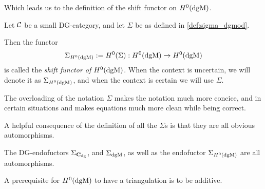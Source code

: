 Which leads us to the definition of the shift functor on \( H^0(\operatorname{dgM}) \).

\begin{definition}
    \label{def:sigma_h_0_dgmod}
    Let \( {\mathcal{C}} \) be a small DG-category, and let \( \Sigma \) be as defined in \autoref{def:sigma_dgmod}.

    Then the functor
    \[
        \Sigma_{H^0(\operatorname{dgM})} := H^0(\Sigma): H^0(\operatorname{dgM}) \to H^0(\operatorname{dgM})
    \]
    is called the \emph{shift functor of \( H^0(\operatorname{dgM}) \)}. When the context is uncertain, we will denote it as \( \Sigma_{H^0(\operatorname{dgM})} \), and when the context is certain we will use \( \Sigma \).
\end{definition}

The overloading of the notation \( \Sigma \) makes the notation much more concice, and in certain situations and makes equations much more clean while being correct.

A helpful consequence of the definition of all the \( \Sigma \)s is that they are all obvious automorphisms.
\begin{remark}
    \label{rem:dgm_sigma_automorphism}
    The DG-endofuctors \( \Sigma_{\operatorname{\mathbf{C}}_{\operatorname{dg}}} \), and \( \Sigma_{\operatorname{dgM}} \), as well as the endofuctor \( \Sigma_{H^0(\operatorname{dgM})} \) are all automorphisms.
\end{remark}

A prerequisite for \( H^0(\operatorname{dgM}) \) to have a triangulation is to be additive.

